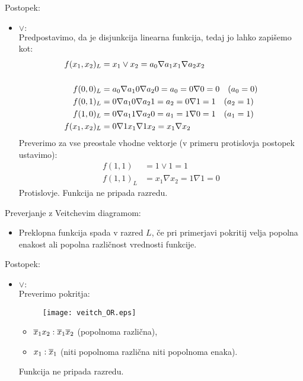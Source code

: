 \begin{resitev}
\begin{enumerate}
Postopek:
\begin{itemize}
\item $\vee:$\\
Predpostavimo, da je disjunkcija linearna funkcija, tedaj jo lahko zapišemo kot:
\begin{align*}
f(x_1,x_2)_L & = x_1 \vee x_2 = a_0 \nabla a_1 x_1 \nabla a_2 x_2\\
\hspace{5mm}\\
f(0,0)_L & = a_0 \nabla a_1 0 \nabla a_2 0 = a_0 = 0 \nabla 0 = 0 \quad (a_0 = 0)\\
f(0,1)_L & = 0 \nabla a_1 0 \nabla a_2 1 = a_2 = 0 \nabla 1 = 1 \quad (a_2 = 1)\\
f(1,0)_L & = 0 \nabla a_1 1 \nabla a_2 0 = a_1 = 1 \nabla 0 = 1 \quad (a_1 = 1)\\
f(x_1,x_2)_L &= 0 \nabla 1 x_1 \nabla 1 x_2 = x_1 \nabla x_2
\end{align*}
Preverimo za vse preostale vhodne vektorje (v primeru protislovja postopek ustavimo):
\begin{align*}
f(1,1) &= 1 \vee 1 = 1 \\
f(1,1)_L &= x_1 \nabla x_2 = 1 \nabla 1 = 0
\end{align*}
Protislovje. Funkcija ne pripada razredu.
\end{itemize}

Preverjanje z Veitchevim diagramom:
\begin{itemize}
\item Preklopna funkcija spada v razred $L$, če pri primerjavi pokritij velja popolna enakost ali popolna različnost vrednosti funkcije.
\end{itemize}

Postopek:
\begin{itemize}
\item $\vee:$\\
Preverimo pokritja:
\begin{figure}[!htb]
	\centering
	\texttt{[image: veitch\_OR.eps]}
	\label{f1}
\end{figure}

\begin{itemize}
\item $\overline x_1 x_2 : \overline x_1 \overline x_2$ (popolnoma različna), \\
\item $x_1 : \overline x_1$ (niti popolnoma različna niti popolnoma enaka).
\end{itemize}
Funkcija ne pripada razredu.
\end{itemize}


\end{enumerate}
\end{resitev}
